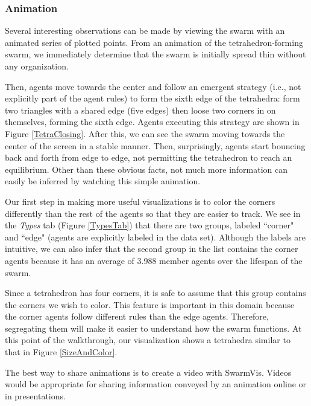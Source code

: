 \documentclass[conference]{IEEEtran}
\begin{document}
\subsubsection{Animation}

Several interesting observations can be made by viewing the swarm with an animated series of plotted points.
From an animation of the tetrahedron-forming swarm,
we immediately determine that the swarm is initially spread thin without any organization.

Then, agents move towards the center and follow an emergent strategy (i.e., not explicitly part of the agent rules)
to form the sixth edge of the tetrahedra: form two triangles with a shared edge (five edges) then loose two corners
in on themselves, forming the sixth edge. Agents executing this strategy are shown in Figure \ref{TetraClosing}.
After this, we can see the swarm moving towards the center of the screen in a stable manner.
Then, surprisingly, agents start bouncing back and forth from edge to edge, not permitting the tetrahedron to
reach an equilibrium. Other than these obvious facts, not much more information can easily be inferred by watching this simple animation.

Our first step in making more useful visualizations is to color the corners differently than the rest of the agents so that
they are easier to track. We see in the \textit{Types} tab (Figure \ref{TypesTab}) that there are two groups, labeled
``corner" and ``edge" (agents are explicitly labeled in the data set). Although the labels are intuitive, we can also infer that the second group in the list contains the corner agents because it has an average of 3.988 member agents over the lifespan of the swarm.

Since a tetrahedron has four corners, it is safe to assume that this group contains the corners we wish to color.
This feature is important in this domain because the corner agents follow different
rules than the edge agents.
Therefore, segregating them will make it easier to understand how the swarm functions.
At this point of the walkthrough, our visualization shows a tetrahedra similar to that in Figure \ref{SizeAndColor}.

The best way to share animations is to create a video with SwarmVis.
Videos would be appropriate for sharing information conveyed by an animation online or in presentations.
\end{document}
